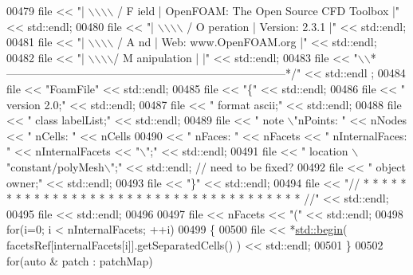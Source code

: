 \begin{DoxyCode}
00479     file << \textcolor{stringliteral}{"| \(\backslash\)\(\backslash\)\(\backslash\)\(\backslash\)      /  F ield         | OpenFOAM: The Open Source CFD Toolbox           |"} << 
      std::endl;
00480     file << \textcolor{stringliteral}{"|  \(\backslash\)\(\backslash\)\(\backslash\)\(\backslash\)    /   O peration     | Version:  2.3.1                                 |"} << 
      std::endl;
00481     file << \textcolor{stringliteral}{"|   \(\backslash\)\(\backslash\)\(\backslash\)\(\backslash\)  /    A nd           | Web:      www.OpenFOAM.org                      |"} << 
      std::endl;
00482     file << \textcolor{stringliteral}{"|    \(\backslash\)\(\backslash\)\(\backslash\)\(\backslash\)/     M anipulation  |                                                 |"} << 
      std::endl;
00483     file << \textcolor{stringliteral}{"\(\backslash\)\(\backslash\)*---------------------------------------------------------------------------*/"} << std::endl
      ;
00484     file << \textcolor{stringliteral}{"FoamFile"} << std::endl;
00485     file << \textcolor{stringliteral}{"\{"} << std::endl;
00486     file << \textcolor{stringliteral}{"    version     2.0;"} << std::endl;
00487     file << \textcolor{stringliteral}{"    format      ascii;"} << std::endl;
00488     file << \textcolor{stringliteral}{"    class       labelList;"} << std::endl;
00489     file << \textcolor{stringliteral}{"    note        \(\backslash\)"nPoints: "} << nNodes << \textcolor{stringliteral}{" nCells: "} << nCells
00490          << \textcolor{stringliteral}{" nFaces: "} << nFacets << \textcolor{stringliteral}{" nInternalFaces: "} << nInternalFacets << \textcolor{stringliteral}{"\(\backslash\)";"} << std::endl;
00491     file << \textcolor{stringliteral}{"    location    \(\backslash\)"constant/polyMesh\(\backslash\)";"} << std::endl; \textcolor{comment}{// need to be fixed?}
00492     file << \textcolor{stringliteral}{"    object      owner;"} << std::endl;
00493     file << \textcolor{stringliteral}{"\}"} << std::endl;
00494     file << \textcolor{stringliteral}{"// * * * * * * * * * * * * * * * * * * * * * * * * * * * * * * * * * * * * * //"} << std::endl;
00495     file << std::endl;
00496 
00497     file << nFacets << \textcolor{stringliteral}{"("} << std::endl;
00498     \textcolor{keywordflow}{for}(i=0; i < nInternalFacets; ++i)
00499     \{
00500         file << *\hyperlink{namespacestd_acec9a198880c12f51f02be95a298a48b}{std::begin}( facetsRef[internalFacets[i]].getSeparatedCells() ) << std::endl;
00501     \}
00502     \textcolor{keywordflow}{for}(\textcolor{keyword}{auto} & patch : patchMap)

\end{DoxyCode}
